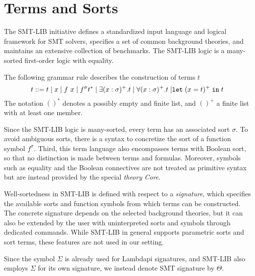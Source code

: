 \section{Terms and Sorts}

The SMT-LIB initiative \cite{smtlib} defines a standardized input language and logical framework for SMT solvers, specifies a set of common background theories, and maintains an extensive collection of benchmarks.
The SMT-LIB logic is a many-sorted first-order logic with equality.

\begin{definition}[Terms]\label{def:smt-grammar}
The following grammar rule describes the construction of terms $t$
\begin{equation*}
t ::= t \mathrel{|} x \mathrel{|} f~x \mathrel{|} f^\sigma t^* \mathrel{|} \exists (x: \sigma)^+. t \mathrel{|} \forall (x: \sigma)^+. t \mathrel{|} \mathrel{\texttt{\upshape{let}}} (x = t)^+ \mathrel{\texttt{\upshape{in}}} t
\end{equation*}
The notation $()^*$ denotes a possibly empty and finite list, and $()^+$ a finite list with at least one member.
\end{definition}

Since the SMT-LIB logic is many-sorted, every term has an associated sort $\sigma$.
To avoid ambiguous sorts, there is a syntax to concretize the sort of a function symbol $f^\sigma$.
Third, this term language also encompasses terms with Boolean sort, so that no distinction is made between terms and formulas.
Moreover, symbols such as equality and the Boolean connectives are not treated as primitive syntax but are instead provided by the special \emph{theory Core}.

Well-sortedness in SMT-LIB is defined with respect to a \emph{signature}, which specifies the available sorts and function symbols from which terms can be constructed.
The concrete signature depends on the selected background theories, but it can also be extended by the user with uninterpreted sorts and symbols through dedicated commands.
While SMT-LIB in general supports parametric sorts and sort terms, these features are not used in our setting.


\begin{notation}
Since the symbol $\Sigma$ is already used for Lambdapi signatures, and SMT-LIB also employs $\Sigma$ for its own signature, we instead denote SMT signature by $\Theta$.  
\end{notation}

